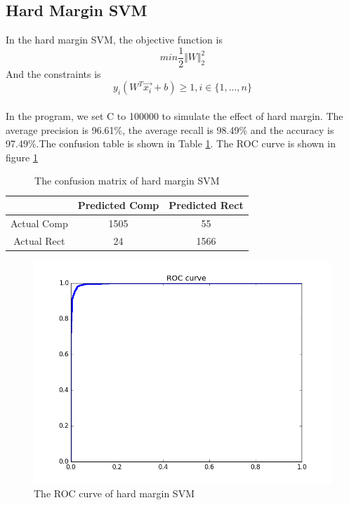 \documentclass{article}
\begin{document}
\subsection{Hard Margin SVM}
In the hard margin SVM, the objective function is
\begin{equation*}
min \frac{1}{2}\Vert W \Vert _2 ^2
\end{equation*}
And the constraints is
\begin{equation*}
y_i(W^T\overrightarrow{x_i}+b)\geq 1, i\in\lbrace 1, ..., n \rbrace
\end{equation*}
\\
In the program, we set C to 100000 to simulate the effect of hard margin. The average precision is 96.61\%, the average recall is 98.49\% and the accuracy is 97.49\%.The confusion table is shown in Table \ref{tb:confu}. The ROC curve  is shown in figure \ref{fig:roc}
\begin{table}
\begin{center}
\caption{The confusion matrix of hard margin SVM}
\label{tb:confu}
\begin{tabular}{|c|c|c|}
\hline
& Predicted Comp& Predicted Rect\\
\hline
Actual Comp&1505&55\\
\hline
Actual Rect&24&1566\\
\hline 	
\end{tabular}
\end{center}
\end{table}

\begin{figure}[htbp]
\centering
\includegraphics[width=.6\textwidth]{roc.png}
\caption{The ROC curve of hard margin SVM}
\label{fig:roc}
\end{figure}
\end{document}
